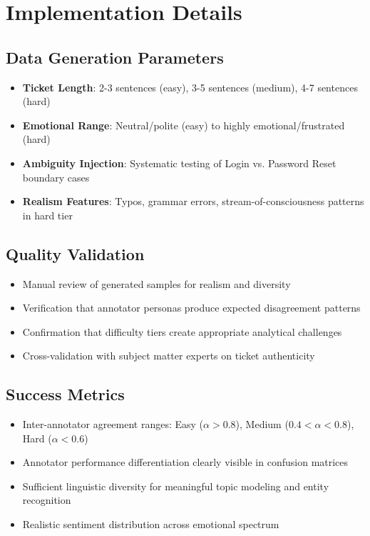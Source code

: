 \documentclass[11pt]{article}
\begin{document}
\section{Implementation Details}

\subsection{Data Generation Parameters}
\begin{itemize}
\item \textbf{Ticket Length}: 2-3 sentences (easy), 3-5 sentences (medium), 4-7 sentences (hard)
\item \textbf{Emotional Range}: Neutral/polite (easy) to highly emotional/frustrated (hard)
\item \textbf{Ambiguity Injection}: Systematic testing of Login vs. Password Reset boundary cases
\item \textbf{Realism Features}: Typos, grammar errors, stream-of-consciousness patterns in hard tier
\end{itemize}

\subsection{Quality Validation}
\begin{itemize}
\item Manual review of generated samples for realism and diversity
\item Verification that annotator personas produce expected disagreement patterns
\item Confirmation that difficulty tiers create appropriate analytical challenges
\item Cross-validation with subject matter experts on ticket authenticity
\end{itemize}

\subsection{Success Metrics}
\begin{itemize}
\item Inter-annotator agreement ranges: Easy ($\alpha > 0.8$), Medium ($0.4 < \alpha < 0.8$), Hard ($\alpha < 0.6$)
\item Annotator performance differentiation clearly visible in confusion matrices
\item Sufficient linguistic diversity for meaningful topic modeling and entity recognition
\item Realistic sentiment distribution across emotional spectrum
\end{itemize}
\end{document}
